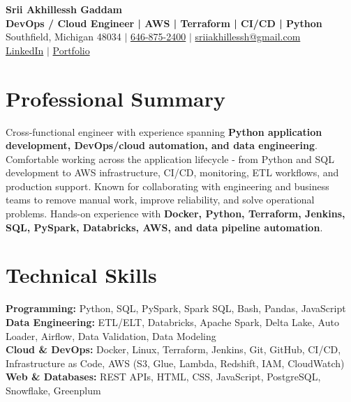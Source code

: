 \documentclass[letterpaper,10pt]{article}
\begin{document}
\fontsize{9.35pt}{10.45pt}\selectfont

\begin{center}
    {\LARGE \textbf{Srii Akhillessh Gaddam}} \\[-1pt]
    \textbf{DevOps / Cloud Engineer | AWS | Terraform | CI/CD | Python} \\[2pt]
    Southfield, Michigan 48034 $|$
    \href{tel:6468752400}{646-875-2400} $|$
    \href{mailto:sriiakhillessh@gmail.com}{sriiakhillessh@gmail.com} \\[1pt]
    \href{https://www.linkedin.com/in/srii-akhiilessh-gaddam-b48668191/}{LinkedIn} $|$
    \href{https://sriiakhillesshg.github.io/portfolio/}{Portfolio}
\end{center}
\vspace{-8pt}

\section{Professional Summary}
\small{Cross-functional engineer with experience spanning \textbf{Python application development, DevOps/cloud automation, and data engineering}. Comfortable working across the application lifecycle - from Python and SQL development to AWS infrastructure, CI/CD, monitoring, ETL workflows, and production support. Known for collaborating with engineering and business teams to remove manual work, improve reliability, and solve operational problems. Hands-on experience with \textbf{Docker, Python, Terraform, Jenkins, SQL, PySpark, Databricks, AWS, and data pipeline automation}.}

\section{Technical Skills}
\small{
\textbf{Programming:} Python, SQL, PySpark, Spark SQL, Bash, Pandas, JavaScript \\
\textbf{Data Engineering:} ETL/ELT, Databricks, Apache Spark, Delta Lake, Auto Loader, Airflow, Data Validation, Data Modeling \\
\textbf{Cloud \& DevOps:} Docker, Linux, Terraform, Jenkins, Git, GitHub, CI/CD, Infrastructure as Code, AWS (S3, Glue, Lambda, Redshift, IAM, CloudWatch) \\
\textbf{Web \& Databases:} REST APIs, HTML, CSS, JavaScript, PostgreSQL, Snowflake, Greenplum
}
\end{document}
